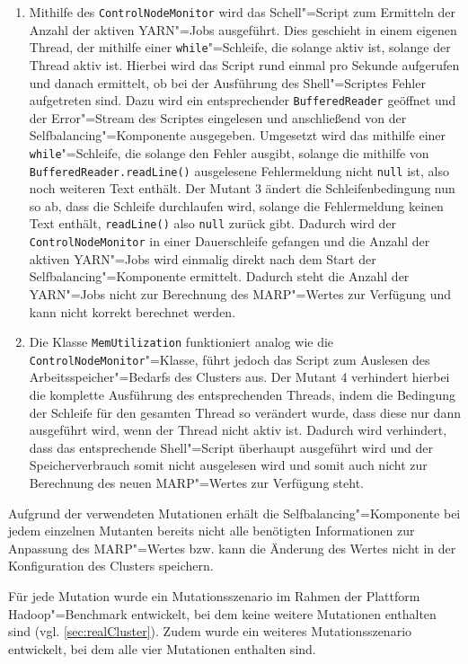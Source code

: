 \begin{enumerate}
    \item
    Mithilfe des \texttt{ControlNodeMonitor} wird das Schell"=Script zum Ermitteln der Anzahl der aktiven \gls{YARN}"=Jobs ausgeführt.
    Dies geschieht in einem eigenen Thread, der mithilfe einer \texttt{while}"=Schleife, die solange aktiv ist, solange der Thread aktiv ist.
    Hierbei wird das Script rund einmal pro Sekunde aufgerufen und danach ermittelt, ob bei der Ausführung des Shell"=Scriptes Fehler aufgetreten sind.
    Dazu wird ein entsprechender \texttt{BufferedReader} geöffnet und der Error"=Stream des Scriptes eingelesen und anschließend von der Selfbalancing"=Komponente ausgegeben.
    Umgesetzt wird das mithilfe einer \texttt{while}"=Schleife, die solange den Fehler ausgibt, solange die mithilfe von \texttt{BufferedReader.readLine()} ausgelesene Fehlermeldung nicht \texttt{null} ist, also noch weiteren Text enthält.
    Der Mutant 3 ändert die Schleifenbedingung nun so ab, dass die Schleife durchlaufen wird, solange die Fehlermeldung keinen Text enthält, \texttt{readLine()} also \texttt{null} zurück gibt.
    Dadurch wird der \texttt{ControlNodeMonitor} in einer Dauerschleife gefangen und die Anzahl der aktiven \gls{YARN}"=Jobs wird einmalig direkt nach dem Start der Selfbalancing"=Komponente ermittelt.
    Dadurch steht die Anzahl der \gls{YARN}"=Jobs nicht zur Berechnung des \gls{MARP}"=Wertes zur Verfügung und kann nicht korrekt berechnet werden.
            
    \item
    Die Klasse \texttt{MemUtilization} funktioniert analog wie die \texttt{ControlNodeMonitor}"=Klasse, führt jedoch das Script zum Auslesen des Arbeitsspeicher"=Bedarfs des Clusters aus.
    Der Mutant 4 verhindert hierbei die komplette Ausführung des entsprechenden Threads, indem die Bedingung der Schleife für den gesamten Thread so verändert wurde, dass diese nur dann ausgeführt wird, wenn der Thread nicht aktiv ist.
    Dadurch wird verhindert, dass das entsprechende Shell"=Script überhaupt ausgeführt wird und der Speicherverbrauch somit nicht ausgelesen wird und somit auch nicht zur Berechnung des neuen \gls{MARP}"=Wertes zur Verfügung steht.
\end{enumerate}

Aufgrund der verwendeten Mutationen erhält die Selfbalancing"=Komponente bei jedem einzelnen Mutanten bereits nicht alle benötigten Informationen zur Anpassung des \gls{MARP}"=Wertes bzw. kann die Änderung des Wertes nicht in der Konfiguration des Clusters speichern.

Für jede Mutation wurde ein Mutationsszenario im Rahmen der Plattform Hadoop"=Benchmark entwickelt, bei dem keine weitere Mutationen enthalten sind (vgl. \cref{sec:realCluster}).
Zudem wurde ein weiteres Mutationsszenario entwickelt, bei dem alle vier Mutationen enthalten sind.
